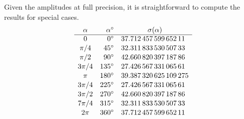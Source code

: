 Given the amplitudes at full precision, it is straightforward to compute the results for special cases.
$$
\begin{array}{crl}
\alpha & \alpha^{\circ }& \multicolumn{1}{c}{\sigma(\alpha)} \\\hline
 0        & 0^{\circ}   & 37.712 \, 457 \, 599 \, 652 \, 11 \\[1pt]
 \pi / 4  & 45^{\circ}  & 32.311 \, 833 \, 530 \, 507 \, 33 \\[1pt]
 \pi / 2  & 90^{\circ}  & 42.660 \, 820 \, 397 \, 187 \, 86 \\[1pt]
 3\pi / 4 & 135^{\circ} & 27.426 \, 567 \, 331 \, 065 \, 61 \\[1pt]
 \pi      & 180^{\circ} & 39.387 \, 320 \, 625 \, 109 \, 275 \\[1pt]
 3\pi / 4 & 225^{\circ} & 27.426 \, 567 \, 331 \, 065 \, 61 \\[1pt]
 3\pi / 2 & 270^{\circ} & 42.660 \, 820 \, 397 \, 187 \, 86 \\[1pt]
 7\pi / 4 & 315^{\circ} & 32.311 \, 833 \, 530 \, 507 \, 33 \\[1pt]
 2 \pi    & 360^{\circ} & 37.712 \, 457 \, 599 \, 652 \, 11 \\
\end{array}
$$


\endinput  %

